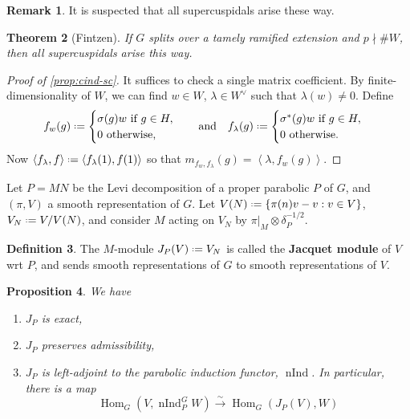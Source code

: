\documentclass[11pt]{report}
\newcommand{\1}{\mathbbm 1}
\newcommand*{\defeq}{\mathrel{\vcenter{\baselineskip0.5ex \lineskiplimit0pt
      \hbox{\scriptsize.}\hbox{\scriptsize.}}}%
  =}
\DeclareMathOperator{\nInd}{nInd}
\DeclareMathOperator{\Hom}{Hom}
\theoremstyle{plain}
\newtheorem{thm}{Theorem}[section]
\newcounter{ex}
\newtheorem{prop}[thm]{Proposition}
\theoremstyle{definition}
\newtheorem{mydef}[thm]{Definition}
\newtheorem{remark}[thm]{Remark}
\theoremstyle{remark}
\numberwithin{equation}{section}
\begin{document}
\begin{remark}
It is suspected that all supercuspidals arise these way.  
\end{remark}

\begin{thm}[Fintzen]
  If $G$ splits over a tamely ramified extension and $p \nmid \# W$, then
  all supercuspidals arise this way.
\end{thm}

\begin{proof}[Proof of \cref{prop:cind-sc}]
  It suffices to check a single matrix coefficient. By finite-dimensionality of $W$, we can find $w \in W$, $\lambda \in W^{\vee}$ such that $\lambda(w) \ne 0$. Define
  \begin{equation}
    f_{w}(g) \defeq
    \begin{cases}
      \sigma(g)w \text{ if } g \in H, \\ 0 \text{ otherwise,} \\
    \end{cases}
    \qq{and}
    f_{\lambda}(g) \defeq
    \begin{cases}
      \sigma^{*}(g)w \text{ if } g \in H, \\ 0 \text{ otherwise.} \\
    \end{cases}
  \end{equation}
  Now $\left\langle f_{\lambda},f \right\rangle \defeq \left\langle f_{\lambda}(1),f(1) \right\rangle $
  so that $m_{f_{w},f_{\lambda}}(g) = \left\langle \lambda,f_{w}(g) \right\rangle $.
\end{proof}

Let $P = MN$ be the Levi decomposition of a proper parabolic $P$ of
$G$, and $(\pi, V)$ a smooth representation of $G$. Let
$V(N) \defeq \{\pi(n)v - v : v \in V\}$, $V_{N} \defeq V/V(N)$, and
consider $M$ acting on $V_{N}$ by $\pi|_{M} \otimes \delta_{P}^{-1/2}$.

\begin{mydef}
The $M$-module $J_{P}(V) \defeq V_{N}$  is called the \textbf{Jacquet module} of $V$ wrt $P$, and sends smooth representations of $G$ to smooth representations of $V$. 
\end{mydef}

\begin{prop}
  We have
  \begin{enumerate}
  \item $J_{P}$ is exact,
  \item $J_{P}$ preserves admissibility,    
  \item $J_{P}$ is left-adjoint to the parabolic induction functor, $\nInd$.
    In particular, there is a map
    \begin{equation}
      \Hom_{G}(V,\nInd_{P}^{G} W) \xrightarrow{\sim} \Hom_{G}(J_{P}(V),W)
    \end{equation}
  \end{enumerate}
\end{prop}
\end{document}
